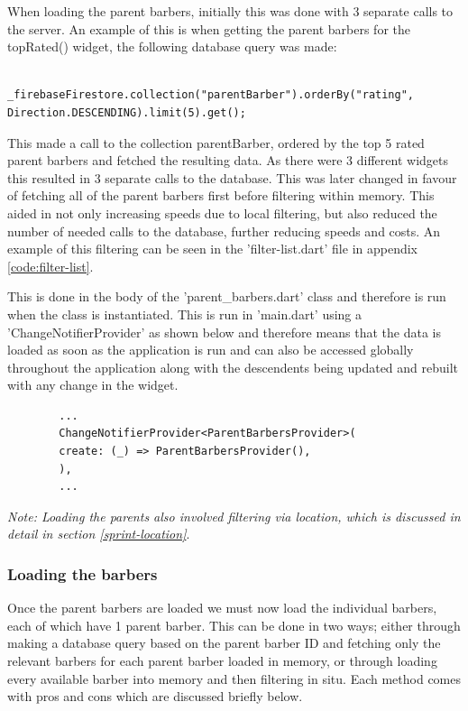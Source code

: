 \documentclass[12pt]{article}
\begin{document}
	When loading the parent barbers, initially this was done with 3 separate calls to the server. An example of this is when getting the parent barbers for the topRated() widget, the following database query was made: 
	\begin{lstlisting}
		_firebaseFirestore.collection("parentBarber").orderBy("rating", Direction.DESCENDING).limit(5).get();
	\end{lstlisting}
	This made a call to the collection parentBarber, ordered by the top 5 rated parent barbers and fetched the resulting data. As there were 3 different widgets this resulted in 3 separate calls to the database. This was later changed in favour of fetching all of the parent barbers first before filtering within memory. This aided in not only increasing speeds due to local filtering, but also reduced the number of needed calls to the database, further reducing speeds and costs. An example of this filtering can be seen in the 'filter-list.dart' file in appendix \ref{code:filter-list}.
	\newline
	
	This is done in the body of the 'parent\_barbers.dart' class and therefore is run when the class is instantiated. This is run in 'main.dart' using a 'ChangeNotifierProvider' as shown below and therefore means that the data is loaded as soon as the application is run and can also be accessed globally throughout the application along with the descendents being updated and rebuilt with any change in the widget.
	
	\begin{verbatim}
		...
		ChangeNotifierProvider<ParentBarbersProvider>(
		create: (_) => ParentBarbersProvider(),
		),
		...
	\end{verbatim}
	
	
	\noindent
	\emph{Note: Loading the parents also involved filtering via location, which is discussed in detail in section \ref{sprint-location}}.
	
	
	\subsubsection{Loading the barbers}
	Once the parent barbers are loaded we must now load the individual barbers, each of which have 1 parent barber. This can be done in two ways; either through making a database query based on the parent barber ID and fetching only the relevant barbers for each parent barber loaded in memory, or through loading every available barber into memory and then filtering in situ. Each method comes with pros and cons which are discussed briefly below.
	\newline
	
\end{document}
